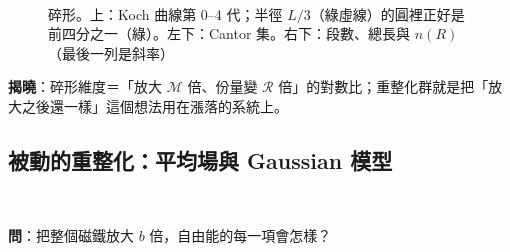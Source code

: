 \begin{figure}[htbp]
\centering
\ElevenFigKoch\\[6pt]
\begin{minipage}[c]{0.5\linewidth}\centering\ElevenFigCantor\end{minipage}\hfill
\begin{minipage}[c]{0.48\linewidth}\centering\footnotesize\setlength{\tabcolsep}{3pt}\ElevenTabFractal\end{minipage}
\caption{碎形。上：Koch 曲線第 0--4 代；半徑 $L/3$（綠虛線）的圓裡正好是前四分之一（綠）。左下：Cantor 集。右下：段數、總長與 $n(R)$（最後一列是斜率）}\label{eleven-fig-fractal}
\end{figure}

\textbf{揭曉}：碎形維度＝「放大 $\mathcal M$ 倍、份量變 $\mathcal R$ 倍」的對數比；重整化群就是把「放大之後還一樣」這個想法用在漲落的系統上。

\subsection{被動的重整化：平均場與 Gaussian 模型}
\leavevmode{}\ \par\nopagebreak

\textbf{問}：把整個磁鐵放大 $b$ 倍，自由能的每一項會怎樣？


